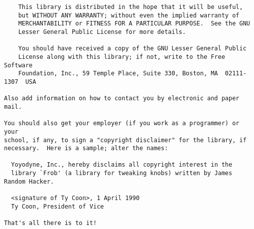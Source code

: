 \documentclass{InsightBook}
\begin{document}
\begin{verbatim}
    This library is distributed in the hope that it will be useful,
    but WITHOUT ANY WARRANTY; without even the implied warranty of
    MERCHANTABILITY or FITNESS FOR A PARTICULAR PURPOSE.  See the GNU
    Lesser General Public License for more details.

    You should have received a copy of the GNU Lesser General Public
    License along with this library; if not, write to the Free Software
    Foundation, Inc., 59 Temple Place, Suite 330, Boston, MA  02111-1307  USA

Also add information on how to contact you by electronic and paper mail.

You should also get your employer (if you work as a programmer) or your
school, if any, to sign a "copyright disclaimer" for the library, if
necessary.  Here is a sample; alter the names:

  Yoyodyne, Inc., hereby disclaims all copyright interest in the
  library `Frob' (a library for tweaking knobs) written by James Random Hacker.

  <signature of Ty Coon>, 1 April 1990
  Ty Coon, President of Vice

That's all there is to it!



\end{verbatim}
\end{document}
